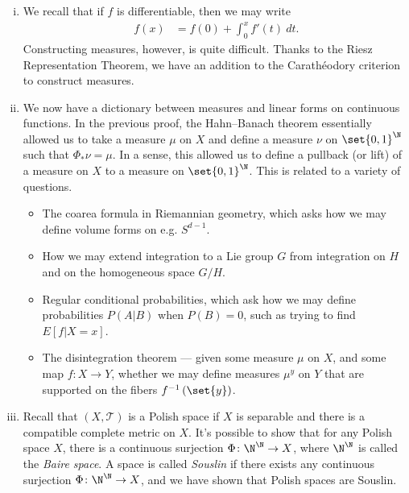 \documentclass[10pt]{mypackage}
\begin{document}
\begin{remark}\hfill
  \begin{enumerate}[(i)]
    \item We recall that if $f$ is differentiable, then we may write
      \begin{align*}
        f(x) &= f(0) + \int_{0}^{x} f'(t)\:dt.
      \end{align*}
      Constructing measures, however, is quite difficult. Thanks to the Riesz Representation Theorem, we have an addition to the Carathéodory criterion to construct measures.
    \item We now have a dictionary between measures and linear forms on continuous functions. In the previous proof, the Hahn--Banach theorem essentially allowed us to take a measure $\mu$ on $X$ and define a measure $\nu$ on $\set{0,1}^{\N}$ such that $\Phi_{\ast}\nu = \mu$. In a sense, this allowed us to define a pullback (or lift) of a measure on $X$ to a measure on $\set{0,1}^{\N}$. This is related to a variety of questions.
      \begin{itemize}
        \item The coarea formula in Riemannian geometry, which asks how we may define volume forms on e.g. $S^{d-1}$.
        \item How we may extend integration to a Lie group $G$ from integration on $H$ and on the homogeneous space $G/H$.
        \item Regular conditional probabilities, which ask how we may define probabilities $P\left( A|B \right)$ when $P(B) = 0$, such as trying to find $E\left[ f|X=x \right]$.
        \item The disintegration theorem --- given some measure $\mu$ on $X$, and some map $f\colon X\to Y$, whether we may define measures $\mu^{y}$ on $Y$ that are supported on the fibers $f^{-1}\left( \set{y} \right)$.
      \end{itemize}
    \item Recall that $\left( X, \mathcal{T} \right)$ is a Polish space if $X$ is separable and there is a compatible complete metric on $X$. It's possible to show that for any Polish space $X$, there is a continuous surjection $\Phi\colon \N^{\N}\to X$, where $\N^{\N}$ is called the \textit{Baire space}. A space is called \textit{Souslin} if there exists any continuous surjection $\Phi\colon \N^{\N}\to X$, and we have shown that Polish spaces are Souslin.
  \end{enumerate}
\end{remark}
\end{document}
